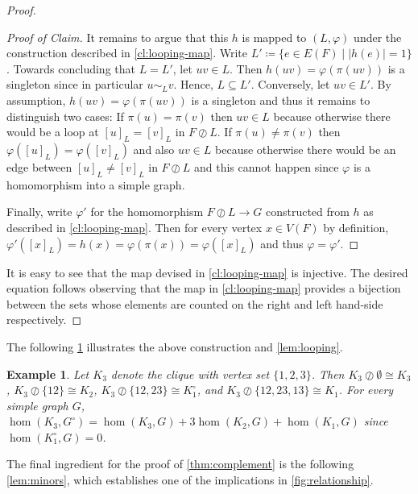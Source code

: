 \documentclass[3p,final]{elsarticle}
\renewcommand\phi\varphi
\newtheorem{example}[theorem]{Example}
\newenvironment{claimproof}[1][Proof of Claim]{\begin{proof}[#1] \renewcommand{\qedsymbol}{$\lrcorner$}}{ \end{proof}}
\begin{document}
\begin{proof}
\begin{claimproof}
		It remains to argue that this $h$ is mapped to $(L, \phi)$ under the construction described in \cref{cl:looping-map}.
		Write $L' \coloneqq \{e \in E(F) \mid |h(e)| = 1\}$. Towards concluding that $L = L'$, 
		let $uv \in L$. Then $h(uv) = \phi(\pi(uv))$ is a singleton since in particular $u \sim_L v$. Hence, $L \subseteq L'$.
		Conversely, let $uv \in L'$. By assumption, $h(uv) = \phi(\pi(uv))$ is a singleton and thus it remains to distinguish two cases:
		If $\pi(u) = \pi(v)$ then $uv \in L$ because otherwise there would be a loop at $[u]_L = [v]_L$ in $F \oslash L$.
		If $\pi(u) \neq \pi(v)$ then $\phi([u]_L) = \phi([v]_L)$ and also $uv \in L$ because otherwise there would be an edge between $[u]_L \neq [v]_L$ in $F \oslash L$ and this cannot happen since $\phi$ is a homomorphism into a simple graph.
		
		Finally, write $\phi'$ for the homomorphism $F \oslash L \to G$ constructed from $h$ as described in \cref{cl:looping-map}. Then for every vertex $x \in V(F)$ by definition, $\phi'([x]_L) = h(x) = \phi(\pi(x)) = \phi([x]_L)$ and thus $\phi = \phi'$.
	\end{claimproof}
	It is easy to see that the map devised in \cref{cl:looping-map} is injective.
	The desired equation follows observing that the map in \cref{cl:looping-map} provides a bijection between the sets whose elements are counted on the right and left hand-side respectively.
\end{proof}
		
	The following \cref{ex:contr} illustrates the above construction and \cref{lem:looping}.
	\begin{example}
		\label{ex:contr}
		Let $K_3$ denote the clique with vertex set $\{1,2,3\}$. Then $K_3 \oslash \emptyset \cong K_3$, $K_3 \oslash \{12\} \cong K_2$, $K_3 \oslash \{12,23\} \cong K_1^\circ$, and $K_3 \oslash \{12,23,13\} \cong K_1$.
		For every simple graph $G$,
		$\hom(K_3, G^\circ) = \hom(K_3, G) + 3 \hom(K_2, G) + \hom(K_1, G)$ since $\hom(K_1^\circ, G) = 0$.
	\end{example}
	
	The final ingredient for the proof of \cref{thm:complement} is the following \cref{lem:minors}, which establishes one of the implications in \cref{fig:relationship}.
	
\end{document}

